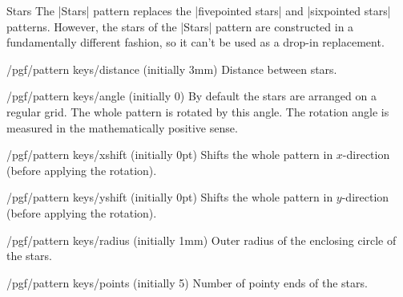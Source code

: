 \begin{pattern}{Stars}
    The |Stars| pattern replaces the |fivepointed stars| and |sixpointed stars|
    patterns. However, the stars of the |Stars| pattern are constructed in a
    fundamentally different fashion, so it can't be used as a drop-in
    replacement.
    \begin{key}{/pgf/pattern keys/distance (initially 3mm)}
        Distance between stars.
    \end{key}
    \begin{key}{/pgf/pattern keys/angle (initially 0)}
        By default the stars are arranged on a regular grid. The whole pattern
        is rotated by this angle. The rotation angle is measured in the
        mathematically positive sense.
    \end{key}
    \begin{key}{/pgf/pattern keys/xshift (initially 0pt)}
        Shifts the whole pattern in $x$-direction (before applying the
        rotation).
    \end{key}
    \begin{key}{/pgf/pattern keys/yshift (initially 0pt)}
        Shifts the whole pattern in $y$-direction (before applying the
        rotation).
    \end{key}
    \begin{key}{/pgf/pattern keys/radius (initially 1mm)}
        Outer radius of the enclosing circle of the stars.
    \end{key}
    \begin{key}{/pgf/pattern keys/points (initially 5)}
        Number of pointy ends of the stars.
    \end{key}
\begin{codeexample}[preamble={\usetikzlibrary{patterns,patterns.meta}}]
\end{codeexample}
\end{pattern}


